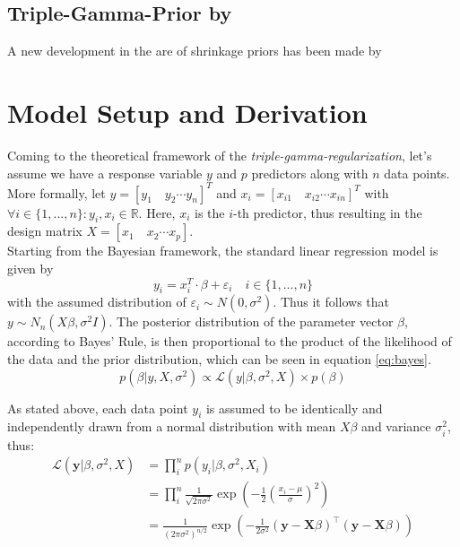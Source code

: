 \documentclass[12pt,a4paper]{article}
\begin{document}
\subsection{Triple-Gamma-Prior by \textcite{TGP2020}}
A new development in the are of shrinkage priors has been made by \textcite{TGP2020}

\newpage
\section{Model Setup and Derivation}
Coming to the theoretical framework of the \textit{triple-gamma-regularization}, let's assume we have a response variable $y$ and $p$ predictors along with $n$ data points. More formally, let $y=[y_1  \quad y_2 \cdots y_n]^T$ and $x_i = [x_{i1} \quad x_{i2} \cdots x_{in}]^T$ with $\forall i\in \{1,...,n\}: y_i, x_i \in \mathbb{R}$. Here, $x_i$ is the $i$-th predictor, thus resulting in the design matrix $X = [x_1 \quad x_2 \cdots x_p]$. \\

Starting from the Bayesian framework, the standard linear regression model is given by
\[
y_i = x_i^T\cdot \beta + \varepsilon_i \quad i\in \{1,...,n\} 
\]
with the assumed distribution of $\varepsilon_i \sim N(0,\sigma^2)$. Thus it follows that $y\sim N_n(X\beta,\sigma^2I)$. The posterior distribution of the parameter vector $\beta$, according to Bayes' Rule, is then proportional to the product of the likelihood of the data and the prior distribution, which can be seen in equation \ref{eq:bayes}.
\begin{equation}\label{eq:bayes}
p(\beta|y, X, \sigma^2) \propto \mathcal{L}(y|\beta, \sigma^2, X)\times p(\beta)
\end{equation}	

As stated above, each data point $y_i$ is assumed to be identically and independently drawn from a normal distribution with mean $X\beta$ and variance $\sigma_i^2$, thus:
\begin{align}
\mathcal{L}(\mathbf{y}|\beta, \sigma^2, X) 	&= \prod_i^n p(y_i|\beta, \sigma^2, X_i) \nonumber\\
						&= \prod_i^n \frac{1}{\sqrt{2\pi\sigma^2}} \exp\left(-\frac{1}{2}\left(\frac{x_i-\mu}{\sigma}\right)^2\right) \nonumber\\
						&= \frac{1}{(2\pi\sigma^2)^{n/2}}\exp\left(-\frac{1}{2\sigma^2}(\mathbf{y}-\mathbf{X}\beta)^\top(\mathbf{y}-\mathbf{X}\beta)\right) \label{eq:likelihood}
\end{align}
\end{document}
